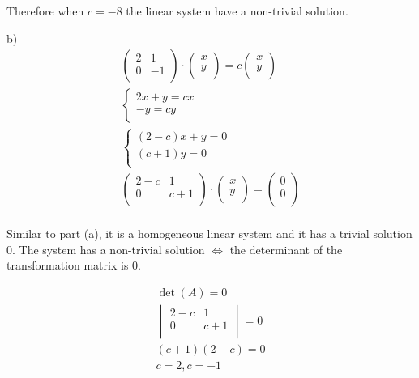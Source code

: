 \documentclass{article}
\begin{document}
Therefore when $c = -8$ the linear system have a non-trivial solution.

b)
\begin{gather*}
  \begin{pmatrix}
    2 & 1 \\
    0 & -1 \\
  \end{pmatrix} \cdot
  \begin{pmatrix}
    x \\
    y \\
  \end{pmatrix} = c
  \begin{pmatrix}
    x \\
    y \\
  \end{pmatrix} \\
  \begin{cases}
    2x + y = cx \\
    -y = cy \\
  \end{cases} \\
  \begin{cases}
    (2 - c)x + y = 0 \\
    (c + 1)y = 0 \\
  \end{cases} \\
  \begin{pmatrix}
    2 - c & 1 \\
    0 & c + 1 \\
  \end{pmatrix} \cdot
  \begin{pmatrix}
    x \\
    y \\
  \end{pmatrix} = 
  \begin{pmatrix}
    0 \\
    0 \\
  \end{pmatrix} \\
\end{gather*}

Similar to part (a), it is a homogeneous linear system and it has a trivial 
solution 0. The system has a non-trivial solution $\iff$ the determinant of the 
transformation matrix is 0.

\begin{gather*}
  \det(A) = 0 \\
  \begin{vmatrix}
    2 - c & 1 \\
    0 & c + 1 \\
  \end{vmatrix} = 0 \\
  (c + 1)(2 - c) = 0 \\
  c = 2, c = -1 \\
\end{gather*}
\end{document}
